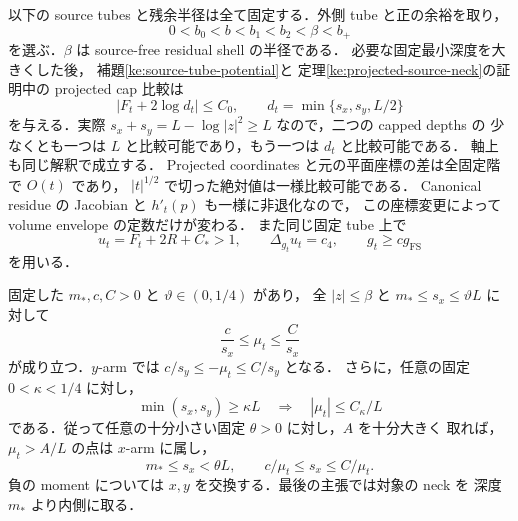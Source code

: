 以下の source tubes と残余半径は全て固定する．外側 tube と正の余裕を取り，
\[
 0<b_0<b<b_1<b_2<\beta<b_+
\]
を選ぶ．$\beta$ は source-free residual shell の半径である．
必要な固定最小深度を大きくした後，
補題\ref{ke:source-tube-potential}と
定理\ref{ke:projected-source-neck}の証明中の projected cap 比較は
\begin{equation}\label{ke:eq:source-min-depth-envelope}
 \bigl|F_t+2\log d_t\bigr|\le C_0,
 \qquad d_t=\min\{s_x,s_y,L/2\}
\end{equation}
を与える．実際 $s_x+s_y=L-\log|z|^2\ge L$ なので，二つの capped depths の
少なくとも一つは $L$ と比較可能であり，もう一つは $d_t$ と比較可能である．
軸上も同じ解釈で成立する．
Projected coordinates と元の平面座標の差は全固定階で $O(t)$ であり，
$|t|^{1/2}$ で切った絶対値は一様比較可能である．
Canonical residue の Jacobian と $h'_t(p)$ も一様に非退化なので，
この座標変更によって volume envelope の定数だけが変わる．
また同じ固定 tube 上で
\begin{equation}\label{ke:eq:source-global-positive-u}
 u_t=F_t+2R+C_*>1,\qquad
 \Delta_{g_t}u_t=c_4,\qquad g_t\ge c g_{\mathrm{FS}}
\end{equation}
を用いる．

\begin{lemma}
\label{ke:source-arm-moment-depth}
固定した $m_*,c,C>0$ と $\vartheta\in(0,1/4)$ があり，
全 $|z|\le\beta$ と $m_*\le s_x\le\vartheta L$ に対して
\begin{equation}\label{ke:eq:source-arm-moment-depth}
 \frac c{s_x}\le\mu_t\le\frac C{s_x}
\end{equation}
が成り立つ．$y$-arm では
$c/s_y\le-\mu_t\le C/s_y$ となる．
さらに，任意の固定 $0<\kappa<1/4$ に対し，
\begin{equation}\label{ke:eq:source-deep-moment-bound}
 \min(s_x,s_y)\ge\kappa L
 \quad\Longrightarrow\quad |\mu_t|\le C_\kappa/L
\end{equation}
である．従って任意の十分小さい固定 $\theta>0$ に対し，$A$ を十分大きく
取れば，$\mu_t>A/L$ の点は $x$-arm に属し，
\[
 m_*\le s_x<\theta L,\qquad c/\mu_t\le s_x\le C/\mu_t.
\]
負の moment については $x,y$ を交換する．最後の主張では対象の neck を
深度 $m_*$ より内側に取る．
\end{lemma}

